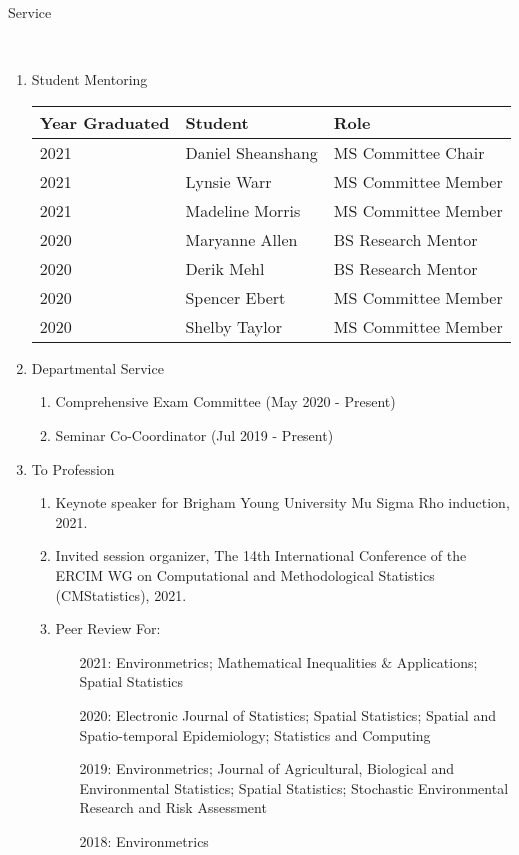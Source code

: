 \documentclass[11pt]{article}
\newcommand{\head}[1]{ %
    \bigskip %
    \begin{large}\begin{bf}{#1}\end{bf}\end{large} %

    \ \\ [-1.3cm] %

    \hrulefill}
\begin{document}
\head{Service}
\begin{enumerate}[label=$\bullet$]

\item Student Mentoring

\begin{table}[H]
\centering
\begin{tabular}{lll}
  \hline
Year Graduated & Student & Role \\ 
  \hline
2021  & Daniel Sheanshang & MS Committee Chair  \\ 
2021  & Lynsie Warr & MS Committee Member  \\ 
2021  & Madeline Morris & MS Committee Member  \\ 
2020  & Maryanne Allen & BS Research Mentor  \\ 
2020  & Derik Mehl & BS Research Mentor \\ 
2020  & Spencer Ebert & MS Committee Member  \\ 
2020  & Shelby Taylor & MS Committee Member  \\ 
   \hline
\end{tabular}
\end{table}


\item Departmental Service
\begin{enumerate}[label=$\cdot$]
\item Comprehensive Exam Committee (May 2020 - Present)
\item Seminar Co-Coordinator (Jul 2019 - Present)
\end{enumerate}
\item To Profession



\begin{enumerate}[label=$\cdot$]
\item Keynote speaker for Brigham Young University Mu Sigma Rho induction, 2021.
\item Invited session organizer, The 14th International Conference of the ERCIM WG on Computational and Methodological Statistics (CMStatistics), 2021.
\item Peer Review For:
\begin{enumerate}
\item[2021:] Environmetrics; Mathematical Inequalities \& Applications; Spatial Statistics
\item[2020:] Electronic Journal of Statistics; Spatial Statistics; Spatial and Spatio-temporal Epidemiology; Statistics and Computing
\item[2019:] Environmetrics; Journal of Agricultural, Biological and Environmental Statistics; Spatial Statistics; Stochastic Environmental Research and Risk Assessment 
\item[2018:] Environmetrics 
\end{enumerate}

\end{enumerate}
\end{enumerate}
\end{document}

